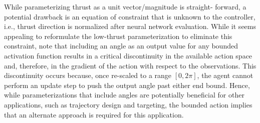 \documentclass[conference]{IEEEtran}
\begin{document}
While parameterizing thrust as a unit vector/magnitude is straight- forward, a potential drawback is an equation of constraint that is unknown to the controller, i.e., thrust direction is normalized after neural network evaluation. While it seems appealing to reformulate the low-thrust parameterization to eliminate this constraint, note that including an angle as an output value for any bounded activation function results in a critical discontinuity in the available action space and, therefore, in the gradient of the action with respect to the observations. This discontinuity occurs because, once re-scaled to a range \([0, 2\pi]\), the agent cannot perform an update step to push the output angle past either end bound. Hence, while parameterizations that include angles are potentially beneficial for other applications, such as trajectory design and targeting, the bounded action implies that an alternate approach is required for this application.
\end{document}
